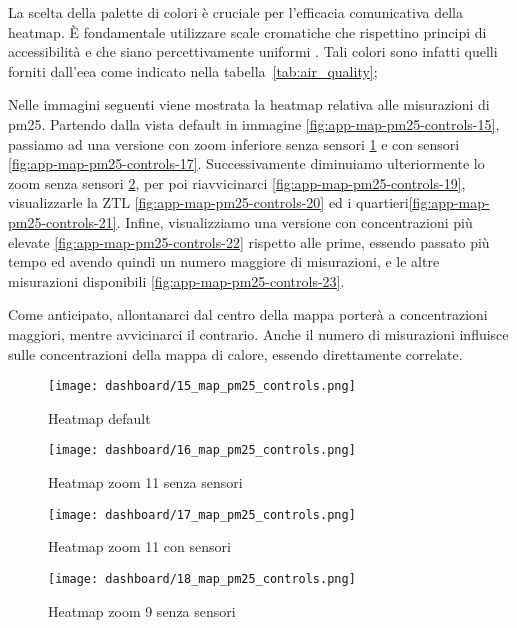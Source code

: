 La scelta della palette di colori è cruciale per l'efficacia comunicativa della heatmap.
È fondamentale utilizzare scale cromatiche che rispettino principi di accessibilità e che siano percettivamente
uniformi \citep{ware2012information}.
Tali colori sono infatti quelli forniti dall'\acrfull{eea} come indicato nella tabella~\ref{tab:air_quality};

Nelle immagini seguenti viene mostrata la heatmap relativa alle misurazioni di \acrshort{pm25}.
Partendo dalla vista default in immagine \ref{fig:app-map-pm25-controls-15},
passiamo ad una versione con zoom inferiore senza sensori \ref{fig:app-map-pm25-controls-16} e
con sensori \ref{fig:app-map-pm25-controls-17}.
Successivamente diminuiamo ulteriormente lo zoom senza sensori \ref{fig:app-map-pm25-controls-18}, per poi
riavvicinarci \ref{fig:app-map-pm25-controls-19}, visualizzarle la ZTL \ref{fig:app-map-pm25-controls-20} ed i
quartieri\ref{fig:app-map-pm25-controls-21}.
Infine, visualizziamo una versione con concentrazioni più elevate \ref{fig:app-map-pm25-controls-22}
rispetto alle prime, essendo passato più tempo ed avendo quindi un numero maggiore di misurazioni, e le altre
misurazioni disponibili \ref{fig:app-map-pm25-controls-23}.

Come anticipato, allontanarci dal centro della mappa porterà a concentrazioni maggiori, mentre avvicinarci il contrario.
Anche il numero di misurazioni influisce sulle concentrazioni della mappa di calore, essendo direttamente correlate.

\begin{figure}[H]
  \centering
  \texttt{[image: dashboard/15\_map\_pm25\_controls.png]}
  \caption{Heatmap default}
  \label{fig:app-map-pm25-controls-15}

  \hfill

  \texttt{[image: dashboard/16\_map\_pm25\_controls.png]}
  \caption{Heatmap zoom 11 senza sensori}
  \label{fig:app-map-pm25-controls-16}
\end{figure}

\begin{figure}[H]
  \centering
  \texttt{[image: dashboard/17\_map\_pm25\_controls.png]}
  \caption{Heatmap zoom 11 con sensori}
  \label{fig:app-map-pm25-controls-17}

  \hfill

  \texttt{[image: dashboard/18\_map\_pm25\_controls.png]}
  \caption{Heatmap zoom 9 senza sensori}
  \label{fig:app-map-pm25-controls-18}
\end{figure}


